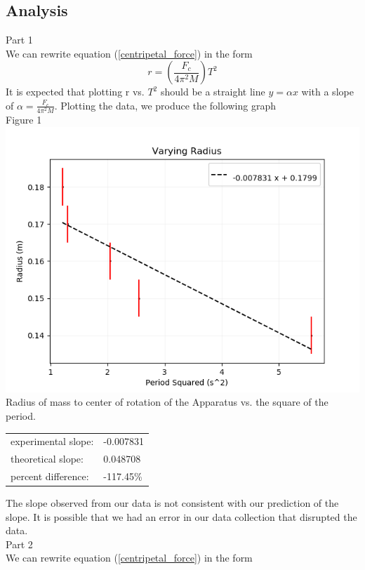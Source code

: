 \documentclass[12pt]{report}
\begin{document}
\begin{flushleft}
\begin{multicols}{2}
\newpage
\section{Analysis}
\large Part 1 \\ \normalsize
We can rewrite equation (\ref{centripetal_force}) in the form
\begin{equation}
r = (\frac{F_c}{4\pi^2M})T^2
\end{equation}
It is expected that plotting r vs. $T^2$ should be a straight line $y = \alpha x$ with a slope of
$\alpha = \frac{F_c}{4\pi^2M}$. Plotting the data, we produce the following graph \\
\small Figure 1 \\
\includegraphics[scale=0.45]{VaryingRadius}
\center Radius of mass to center of rotation of the Apparatus vs. the square of the period.\\
\begin{tabular}{ll}
experimental slope: & -0.007831 \\
theoretical slope: & 0.048708 \\
percent difference: & -117.45\%
\end{tabular}
\flushleft The slope observed from our data is not consistent with our
prediction of the slope. It is possible that we had an error in our data collection
that disrupted the data. \\
\vspace{10px}
\large Part 2 \\ \normalsize
We can rewrite equation (\ref{centripetal_force}) in the form
\begin{equation} \label{centripetal_force2}

\end{equation}
\end{multicols}
\end{flushleft}
\end{document}
